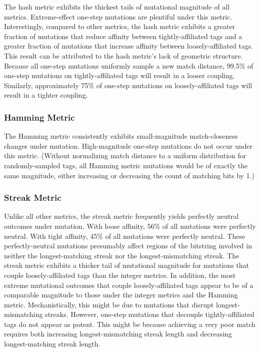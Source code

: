 The hash metric exhibits the thickest tails of mutational magnitude of all metrics.
Extreme-effect one-step mutations are plentiful under this metric.
Interestingly, compared to other metrics, the hash metric exhibits a greater fraction of mutations that reduce affinity between tightly-affiliated tags and a greater fraction of mutations that increase affinity between loosely-affiliated tags.
This result can be attributed to the hash metric's lack of geometric structure.
Because all one-step mutations uniformly sample a new match distance, 99.5\% of one-step mutations on tightly-affiliated tags will result in a looser coupling.
Similarly, approximately 75\% of one-step mutations on loosely-affiliated tags will result in a tighter coupling.

\subsubsection{Hamming Metric}

The Hamming metric consistently exhibits small-magnitude match-closeness changes under mutation.
High-magnitude one-step mutations do not occur under this metric.
(Without normalizing match distance to a uniform distribution for randomly-sampled tags, all Hamming metric mutations would be of exactly the same magnitude, either increasing or decreasing the count of matching bits by 1.)

\subsubsection{Streak Metric}

Unlike all other metrics, the streak metric frequently yields perfectly neutral outcomes under mutation.
With loose affinity, 56\% of all mutations were perfectly neutral.
With tight affinity, 45\% of all mutations were perfectly neutral.
These perfectly-neutral mutations presumably affect regions of the bitstring involved in neither the longest-matching streak nor the longest-mismatching streak.
The streak metric exhibits a thicker tail of mutational magnitude for mutations that couple loosely-affiliated tags than the integer metrics.
In addition, the most extreme mutational outcomes that couple loosely-affiliated tags appear to be of a comparable magnitude to those under the integer metrics and the Hamming metric.
Mechanistically, this might be due to mutations that disrupt longest-mismatching streaks.
However, one-step mutations that decouple tightly-affiliated tags do not appear as potent.
This might be because achieving a very poor match requires both increasing longest-mismatching streak length and decreasing longest-matching streak length.

